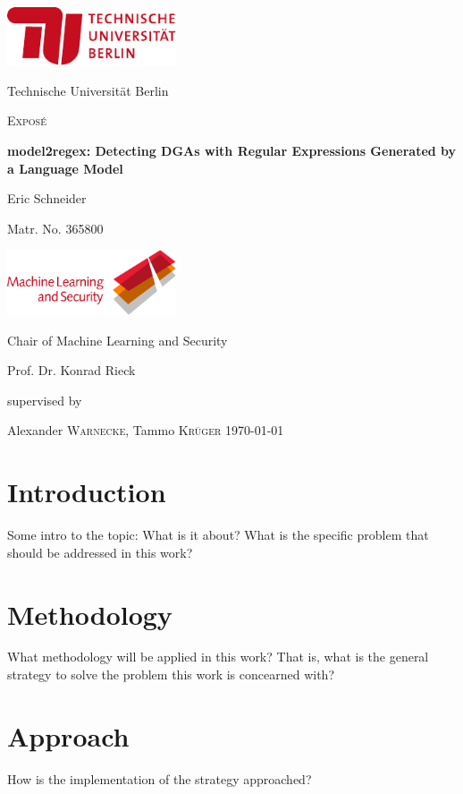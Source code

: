 \documentclass[a4paper, 12pt]{article}
\newcommand{\thesistitle}{model2regex: Detecting DGAs with Regular Expressions Generated by a Language Model}
\newcommand{\thesisauthor}{Eric Schneider}
\newcommand{\matrno}{365800}
\newcommand{\supervisor}{Alexander \textsc{Warnecke}, Tammo \textsc{Kr\"uger}}
\begin{document}
\begin{titlepage}
	\centering
	\includegraphics[width=5cm]{tub-logo}\par\vspace{0.5cm}
	{Technische Universität Berlin \par}
	\vspace{2cm}
	{\large \textsc{Exposé}\par}
	\vspace{1cm}
	{\Large\bfseries \thesistitle\par}
	\vspace{2cm}
	{\large \thesisauthor\par}
	{\large Matr. No. \matrno\par}
	\vspace{2cm}
	\includegraphics[width=5cm]{mlsec-logo-red2}\par\vspace{0.5cm}
	{Chair of Machine Learning and Security \par}
	{Prof. Dr. Konrad Rieck \par}
	\vfill
	supervised by\par
	\supervisor
	\vfill
	\today\par
\end{titlepage}

\section{Introduction}
Some intro to the topic: What is it about? What is the specific problem that
should be addressed in this work?

\section{Methodology}
What methodology will be applied in this work? That is, what is the general
strategy to solve the problem this work is concearned with?

\section{Approach}
How is the implementation of the strategy approached?
\end{document}
